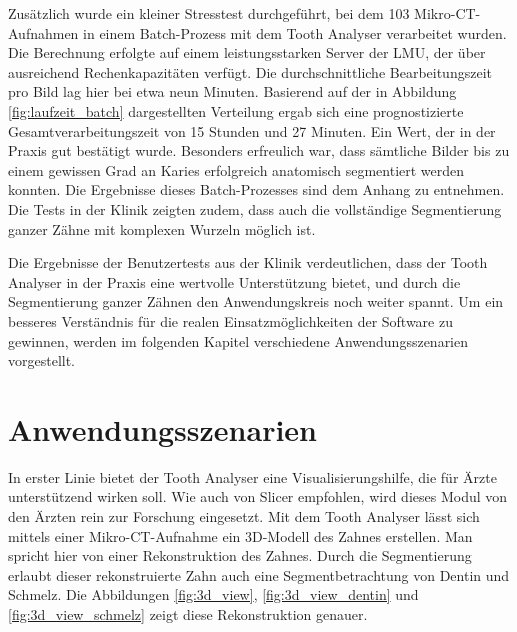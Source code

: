Zusätzlich wurde ein kleiner Stresstest durchgeführt, bei dem 103 Mikro-\ac{CT}-Aufnahmen
in einem Batch-Prozess mit dem Tooth Analyser verarbeitet wurden. Die Berechnung
erfolgte auf einem leistungsstarken Server der LMU, der über ausreichend Rechenkapazitäten
verfügt. Die durchschnittliche Bearbeitungszeit pro Bild lag hier bei etwa neun
Minuten. Basierend auf der in Abbildung \ref{fig:laufzeit_batch} dargestellten Verteilung
ergab sich eine prognostizierte Gesamtverarbeitungszeit von 15 Stunden und 27 Minuten.
Ein Wert, der in der Praxis gut bestätigt wurde. Besonders erfreulich war, dass sämtliche
Bilder bis zu einem gewissen Grad an Karies erfolgreich anatomisch segmentiert werden
konnten. Die Ergebnisse dieses Batch-Prozesses sind dem Anhang zu entnehmen. Die
Tests in der Klinik zeigten zudem, dass auch die vollständige Segmentierung
ganzer Zähne mit komplexen Wurzeln möglich ist.

Die Ergebnisse der Benutzertests aus der Klinik verdeutlichen, dass der Tooth Analyser
in der Praxis eine wertvolle Unterstützung bietet, und durch die Segmentierung
ganzer Zähnen den Anwendungskreis noch weiter spannt. Um ein besseres Verständnis
für die realen Einsatzmöglichkeiten der Software zu gewinnen, werden im
folgenden Kapitel verschiedene Anwendungsszenarien vorgestellt.

\section{Anwendungsszenarien}
In erster Linie bietet der Tooth Analyser eine Visualisierungshilfe, die für Ärzte
unterstützend wirken soll. Wie auch von Slicer empfohlen, wird dieses Modul von den
Ärzten rein zur Forschung eingesetzt. Mit dem Tooth Analyser lässt sich mittels
einer Mikro-\ac{CT}-Aufnahme ein \ac{3D}-Modell des Zahnes erstellen. Man spricht
hier von einer Rekonstruktion des Zahnes. Durch die Segmentierung erlaubt dieser
rekonstruierte Zahn auch eine Segmentbetrachtung von Dentin und Schmelz. Die Abbildungen
\ref{fig:3d_view}, \ref{fig:3d_view_dentin} und \ref{fig:3d_view_schmelz} zeigt
diese Rekonstruktion genauer.

